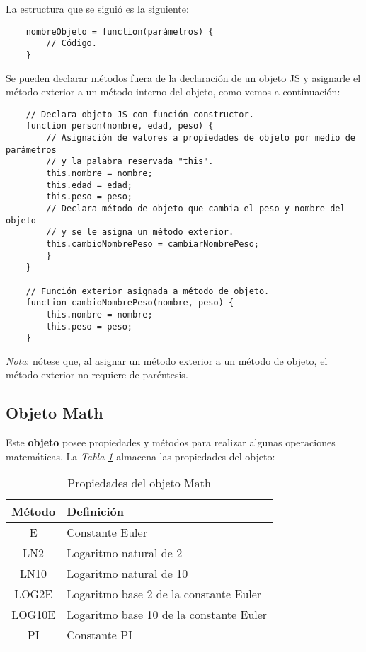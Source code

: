 La estructura que se siguió es la siguiente:
\begin{lstlisting}
    nombreObjeto = function(parámetros) {
        // Código.
    }
\end{lstlisting}

Se pueden declarar métodos fuera de la declaración de un objeto JS y asignarle el método exterior a un método interno del objeto, como vemos a continuación:
\begin{lstlisting}
    // Declara objeto JS con función constructor.
    function person(nombre, edad, peso) {
        // Asignación de valores a propiedades de objeto por medio de parámetros
        // y la palabra reservada "this".
        this.nombre = nombre;
        this.edad = edad;
        this.peso = peso;
        // Declara método de objeto que cambia el peso y nombre del objeto
        // y se le asigna un método exterior.
        this.cambioNombrePeso = cambiarNombrePeso;
        }
    }
    
    // Función exterior asignada a método de objeto.
    function cambioNombrePeso(nombre, peso) {
        this.nombre = nombre;
        this.peso = peso;
    }
\end{lstlisting}

\textit{Nota}: nótese que, al asignar un método exterior a un método de objeto, el método exterior no requiere de paréntesis.


\subsection{Objeto Math}

Este \textbf{objeto} posee propiedades y métodos para realizar algunas operaciones matemáticas. La \textit{Tabla \ref{tab: 6}} almacena las propiedades del objeto:
\begin{table}[H]
    \begin{center}
        \caption{Propiedades del objeto Math}
        \label{tab: 6}
        \begin{tabular}{c l}
            \hline
            \textbf{Método}&\textbf{Definición} \\
            \hline
            E & Constante Euler \\
            LN2 & Logaritmo natural de 2 \\
            LN10 & Logaritmo natural de 10 \\
            LOG2E & Logaritmo base 2 de la constante Euler \\
            LOG10E & Logaritmo base 10 de la constante Euler \\
            PI & Constante PI \\
            \hline
        \end{tabular}
    \end{center}
\end{table}

